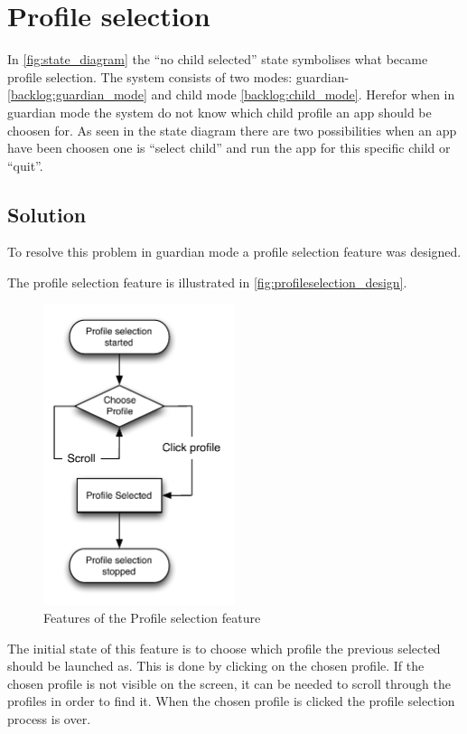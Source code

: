 \section{Profile selection}
\label{design:profile_selection}
In \autoref{fig:state_diagram} the ``no child selected'' state symbolises what became profile selection. The \giraf[] system consists of two modes: guardian- \autoref{backlog:guardian_mode} and child mode \autoref{backlog:child_mode}. Herefor when in guardian mode the system do not know which child profile an app should be choosen for. As seen in the state diagram there are two possibilities when an app have been choosen one is ``select child'' and run the app for this specific child or ``quit''.

\subsection{Solution}

To resolve this problem in guardian mode a profile selection feature was designed.

The profile selection feature is illustrated in \autoref{fig:profileselection_design}. 
\label{design:profile_selection}
\begin{figure}[h]
	\centering
	\includegraphics[width=0.5\textwidth]{gfx/profileselect_design.pdf}
	\caption{Features of the Profile selection feature}
	\label{fig:profileselection_design}
\end{figure}

The initial state of this feature is to choose which profile the previous selected should be launched as. This is done by clicking on the chosen profile. If the chosen profile is not visible on the screen, it can be needed to scroll through the profiles in order to find it. When the chosen profile is clicked the profile selection process is over.